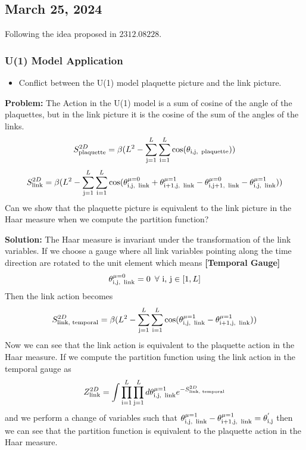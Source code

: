\begin{center}
\section*{\creationmonth}
\end{center}

\subsection*{March 25, 2024}
Following the idea proposed in $2312.08228$. 
\subsubsection*{U(1) Model Application}
\begin{itemize}
    \item Conflict between the U(1) model plaquette picture and the link picture.
\end{itemize}

\textbf{Problem:} 
The Action in the U(1) model is a sum of cosine of the angle of the plaquettes, but in the link picture  it is the cosine of the sum of the angles of the links.
\begin{equation}
    S_{\text{plaquette}}^{2D} = \beta(L^2- \sum_{\text{j}=1}^{L}\sum_{\text{i}=1}^{L} \cos(\theta_{\text{i,j, \,plaquette}}))
\end{equation}
\begin{equation}
    S_{\text{link}}^{2D} = \beta(L^2- \sum_{\text{j}=1}^{L}\sum_{\text{i}=1}^{L}\cos(\theta_{\text{i,j, \,link}}^{\mu=0}+\theta_{\text{i+1,j, \,link}}^{\mu=1}-\theta_{\text{i,j+1, \,link}}^{\mu=0}-\theta_{\text{i,j, \,link}}^{\mu=1}))
\end{equation}
Can we show that the plaquette picture is equivalent to the link picture in the Haar measure when we compute the partition function?

\textbf{Solution:}
The Haar measure is invariant under the transformation of the link variables. If we choose a gauge where all link variables pointing along the time direction are rotated to the unit element which means \textbf{[Temporal Gauge]} $$\theta^{\mu=0}_{\text{i,j,\, link}} = 0 \,\,\,\forall\,\,\text{i, j}\in[1, L]$$
Then the link action becomes
\begin{equation}
    S_{\text{link, temporal}}^{2D} = \beta(L^2- \sum_{\text{j}=1}^{L}\sum_{\text{i}=1}^{L}\cos(\theta_{\text{i,j, \,link}}^{\mu=1}-\theta_{\text{i+1,j, \,link}}^{\mu=1}))
\end{equation}
Now we can see that the link action is equivalent to the plaquette action in the Haar measure. If we compute the partition function using the link action in the temporal gauge as
\begin{equation}
    Z^{2D}_{\text{link}} = \int \prod_{\text{i}=1}^{L}\prod_{\text{j}=1}^{L}d\theta_{\text{i,j, \,link}}^{\mu=1}e^{-S_{\text{link, temporal}}^{2D}}
\end{equation}
and we perform a change of variables such that $\theta_{\text{i,j, \,link}}^{\mu=1}  - \theta_{\text{i+1,j, \,link}}^{\mu=1}= \theta^{'}_{\text{i,j}}$ then we can see that the partition function is equivalent to the plaquette action in the Haar measure.

